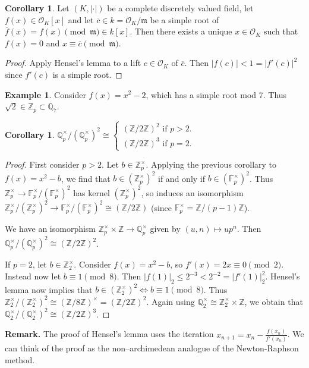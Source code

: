 \documentclass{article}
\theoremstyle{definition}
\newtheorem{cor}[theorem]{Corollary}
\newtheorem{example}{Example}[section]
\begin{document}
\begin{cor}
    Let $(K,|\cdot|)$ be a complete discretely valued field, let $f(x) \in \mathcal{O}_K[x]$ and let $\overline{c} \in k = \mathcal{O}_K/\mathfrak{m}$ be a simple root of $\overline{f}(x) = f(x) \pmod{\mathfrak{m}} \in k[x]$. Then there exists a unique $x \in \mathcal{O}_K$ such that $f(x) = 0$ and $x \equiv \overline{c} \pmod{\mathfrak{m}}$.
\end{cor}
\begin{proof}
    Apply Hensel's lemma to a lift $c \in \mathcal{O}_K$ of $\overline{c}$. Then $|f(c)| < 1 = |f'(c)|^2$ since $f'(c)$ is a simple root.
\end{proof}
\begin{example}
    Consider $f(x) = x^2-2$, which has a simple root mod 7. Thus $\sqrt{2} \in \mathbb{Z}_p \subset \mathbb{Q}_7$.
\end{example}
\begin{cor}
    $\mathbb{Q}_p^\times/(\mathbb{Q}_p^\times)^2 \cong \begin{cases}
        (\mathbb{Z}/2\mathbb{Z})^2 \text{ if } p>2.\\
        (\mathbb{Z}/2\mathbb{Z})^3 \text{ if } p=2.
    \end{cases}$
\end{cor}
\begin{proof}
    First consider $p>2$. Let $b \in \mathbb{Z}_p^\times$. Applying the previous corollary to $f(x) = x^2-b$, we find that $b \in (\mathbb{Z}_p^\times)^2$ if and only if $b \in (\mathbb{F}_p^\times)^2$. Thus $\mathbb{Z}_p^\times \to \mathbb{F}_p^\times/(\mathbb{F}_p^\times)^2$ has kernel $(\mathbb{Z}_p^\times)^2$, so induces an isomorphism $\mathbb{Z}_p^\times/(\mathbb{Z}_p^\times)^2 \to \mathbb{F}_p^\times/(\mathbb{F}_p^\times)^2 \cong (\mathbb{Z}/2\mathbb{Z})$ (since $\mathbb{F}_p^{\times} = \mathbb{Z}/(p-1)\mathbb{Z}$).
    \vspace{1mm}
     
    We have an isomorphism $\mathbb{Z}_p^\times \times \mathbb{Z} \to \mathbb{Q}_p^{\times}$ given by $(u,n) \mapsto up^n$. Then $\mathbb{Q}_p^\times / (\mathbb{Q}_p^\times)^2 \cong (\mathbb{Z}/2\mathbb{Z})^2$.
    \vspace{1mm}
     
    If $p=2$, let $b \in \mathbb{Z}_2^\times$. Consider $f(x) = x^2 - b$, so $f'(x) = 2x \equiv 0 \pmod{2}$. Instead now let $b \equiv 1 \pmod{8}$. Then $|f(1)|_2 \le 2^{-3} < 2^{-2} = |f'(1)|_2^2$. Hensel's lemma now implies that $b \in (\mathbb{Z}_2^\times)^2 \iff b \equiv 1 \pmod{8}$. Thus $\mathbb{Z}_2^\times / (\mathbb{Z}_2^\times)^2 \cong (\mathbb{Z}/8\mathbb{Z})^\times = (\mathbb{Z}/2\mathbb{Z})^2$. Again using $\mathbb{Q}_2^\times \cong \mathbb{Z}_2^\times \times \mathbb{Z}$, we obtain that $\mathbb{Q}_2^\times/(\mathbb{Q}_2^\times)^2 \cong (\mathbb{Z}/2\mathbb{Z})^3$. 
\end{proof}
\textbf{Remark.} The proof of Hensel's lemma uses the iteration $x_{n+1} = x_n - \frac{f(x_n)}{f'(x_n)}$. We can think of the proof as the non--archimedean analogue of the Newton-Raphson method.
\end{document}
